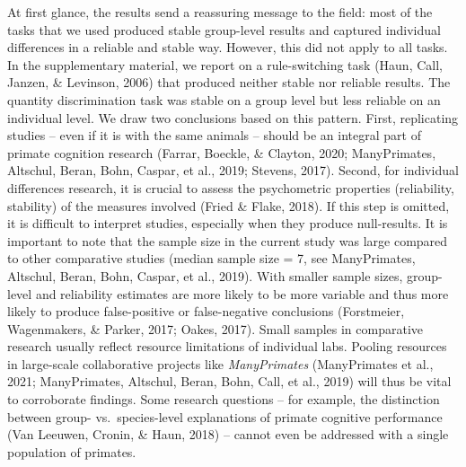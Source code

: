 \documentclass[
  man,floatsintext]{apa6}
\begin{document}
At first glance, the results send a reassuring message to the field: most of the tasks that we used produced stable group-level results and captured individual differences in a reliable and stable way. However, this did not apply to all tasks. In the supplementary material, we report on a rule-switching task (Haun, Call, Janzen, \& Levinson, 2006) that produced neither stable nor reliable results. The quantity discrimination task was stable on a group level but less reliable on an individual level. We draw two conclusions based on this pattern. First, replicating studies -- even if it is with the same animals -- should be an integral part of primate cognition research (Farrar, Boeckle, \& Clayton, 2020; ManyPrimates, Altschul, Beran, Bohn, Caspar, et al., 2019; Stevens, 2017). Second, for individual differences research, it is crucial to assess the psychometric properties (reliability, stability) of the measures involved (Fried \& Flake, 2018). If this step is omitted, it is difficult to interpret studies, especially when they produce null-results. It is important to note that the sample size in the current study was large compared to other comparative studies (median sample size = 7, see ManyPrimates, Altschul, Beran, Bohn, Caspar, et al., 2019). With smaller sample sizes, group-level and reliability estimates are more likely to be more variable and thus more likely to produce false-positive or false-negative conclusions (Forstmeier, Wagenmakers, \& Parker, 2017; Oakes, 2017). Small samples in comparative research usually reflect resource limitations of individual labs. Pooling resources in large-scale collaborative projects like \emph{ManyPrimates} (ManyPrimates et al., 2021; ManyPrimates, Altschul, Beran, Bohn, Call, et al., 2019) will thus be vital to corroborate findings. Some research questions -- for example, the distinction between group- vs.~species-level explanations of primate cognitive performance (Van Leeuwen, Cronin, \& Haun, 2018) -- cannot even be addressed with a single population of primates.
\end{document}
